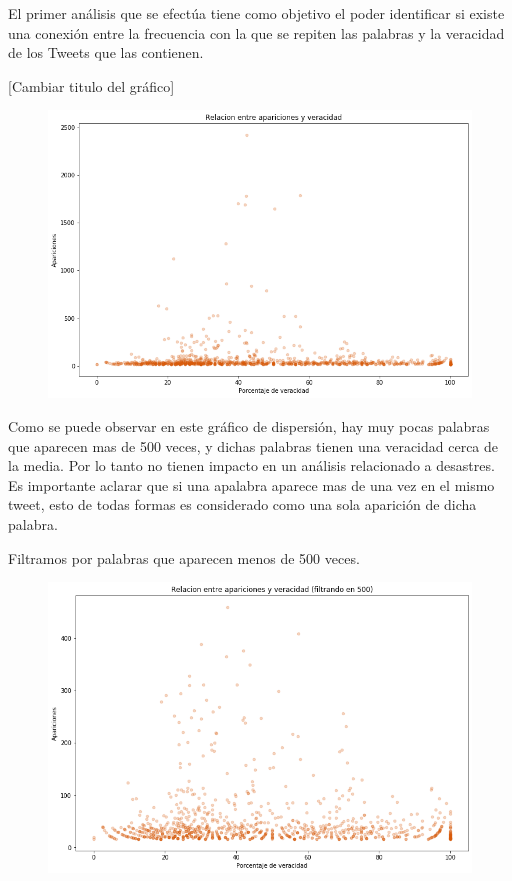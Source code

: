\documentclass[titlepage,a4paper]{article}
\begin{document}
    El primer análisis que se efectúa tiene como objetivo el poder identificar si existe una conexión entre la frecuencia con la que se repiten las palabras y la veracidad de los Tweets que las contienen.
    

    [Cambiar titulo del gráfico]
    
    \begin{figure}[H]
    \centering
    \includegraphics[width=1\textwidth]{graficos/Analisis Lexico Grafico/relacion_entre_apariciones_y_veracidad_2.png}
    \caption{} 
    \end{figure}
    
    Como se puede observar en este gráfico de dispersión, hay muy pocas palabras que aparecen mas de 500 veces, y dichas palabras tienen una veracidad cerca de la media. Por lo tanto no tienen impacto en un análisis relacionado a desastres. Es importante aclarar que si una apalabra aparece mas de una vez en el mismo tweet, esto de todas formas es considerado como una sola aparición de dicha palabra.
    
    Filtramos por palabras que aparecen menos de 500 veces. 
        
    \begin{figure}[H]
    \centering
    \includegraphics[width=1\textwidth]{graficos/Analisis Lexico Grafico/relacion_entre_apariciones_y_veracidad_filt_500.png}
    \caption{}   
    \end{figure}
    
\end{document}
